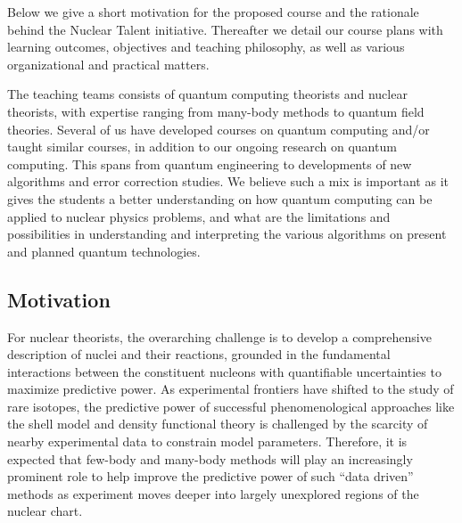 \documentclass[twocolumn,superscriptaddress,amsmath,amssymb,aps,floatfix]{revtex4-2}
\begin{document}
Below we give a short motivation for the proposed course and the
rationale behind the Nuclear Talent initiative. Thereafter we detail our
course plans with learning outcomes, objectives and teaching philosophy,
as well as various organizational and practical matters.

The teaching teams consists of quantum computing theorists and nuclear
theorists, with expertise ranging from many-body methods to quantum
field theories. Several of us have developed courses on quantum
computing and/or taught similar courses, in addition to our ongoing
research on quantum computing. This spans from quantum engineering to
developments of new algorithms and error correction studies. We believe
such a mix is important as it gives the students a better understanding
on how quantum computing can be applied to nuclear physics problems, and
what are the limitations and possibilities in understanding and
interpreting the various algorithms on present and planned quantum
technologies.

    \subsection{Motivation}\label{motivation}

For nuclear theorists, the overarching challenge is to develop a
comprehensive description of nuclei and their reactions, grounded in the
fundamental interactions between the constituent nucleons with
quantifiable uncertainties to maximize predictive power. As experimental
frontiers have shifted to the study of rare isotopes, the predictive
power of successful phenomenological approaches like the shell model and
density functional theory is challenged by the scarcity of nearby
experimental data to constrain model parameters. Therefore, it is
expected that few-body and many-body methods will play an increasingly
prominent role to help improve the predictive power of such ``data
driven'' methods as experiment moves deeper into largely unexplored
regions of the nuclear chart.
\end{document}
